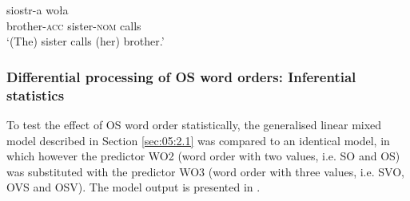 \ea%
    \label{ex:05:3}
         {siostr-a}   {woła}\\
            brother-\textsc{acc}  sister-\textsc{nom}  calls\\
    \glt    `(The) sister calls (her) brother.'
    \z

\subsubsection{Differential processing of OS word orders: Inferential statistics}\label{sec:05:2.5.1}

To test the effect of OS word order statistically, the generalised linear mixed model described in Section \ref{sec:05:2.1} was compared to an identical model, in which however the predictor WO2 (word order with two values, i.e. SO and OS) was substituted with the predictor WO3 (word order with three values, i.e. SVO, OVS and OSV). The model output is presented in .

